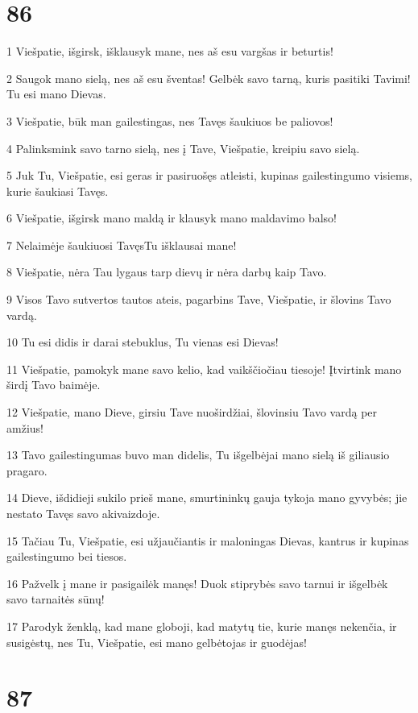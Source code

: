 \chapter{86}


\par 1 Viešpatie, išgirsk, išklausyk mane, nes aš esu vargšas ir beturtis! 
\par 2 Saugok mano sielą, nes aš esu šventas! Gelbėk savo tarną, kuris pasitiki Tavimi! Tu esi mano Dievas. 
\par 3 Viešpatie, būk man gailestingas, nes Tavęs šaukiuos be paliovos! 
\par 4 Palinksmink savo tarno sielą, nes į Tave, Viešpatie, kreipiu savo sielą. 
\par 5 Juk Tu, Viešpatie, esi geras ir pasiruošęs atleisti, kupinas gailestingumo visiems, kurie šaukiasi Tavęs. 
\par 6 Viešpatie, išgirsk mano maldą ir klausyk mano maldavimo balso! 
\par 7 Nelaimėje šaukiuosi Tavęs­Tu išklausai mane! 
\par 8 Viešpatie, nėra Tau lygaus tarp dievų ir nėra darbų kaip Tavo. 
\par 9 Visos Tavo sutvertos tautos ateis, pagarbins Tave, Viešpatie, ir šlovins Tavo vardą. 
\par 10 Tu esi didis ir darai stebuklus, Tu vienas esi Dievas! 
\par 11 Viešpatie, pamokyk mane savo kelio, kad vaikščiočiau tiesoje! Įtvirtink mano širdį Tavo baimėje. 
\par 12 Viešpatie, mano Dieve, girsiu Tave nuoširdžiai, šlovinsiu Tavo vardą per amžius! 
\par 13 Tavo gailestingumas buvo man didelis, Tu išgelbėjai mano sielą iš giliausio pragaro. 
\par 14 Dieve, išdidieji sukilo prieš mane, smurtininkų gauja tykoja mano gyvybės; jie nestato Tavęs savo akivaizdoje. 
\par 15 Tačiau Tu, Viešpatie, esi užjaučiantis ir maloningas Dievas, kantrus ir kupinas gailestingumo bei tiesos. 
\par 16 Pažvelk į mane ir pasigailėk manęs! Duok stiprybės savo tarnui ir išgelbėk savo tarnaitės sūnų! 
\par 17 Parodyk ženklą, kad mane globoji, kad matytų tie, kurie manęs nekenčia, ir susigėstų, nes Tu, Viešpatie, esi mano gelbėtojas ir guodėjas!


\chapter{87}


